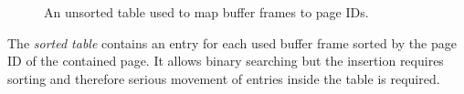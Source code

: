 \begin{@empty}

	\begin{figure}[ht!]
		\centering
        \vspace{.5em}
		\caption{An unsorted table used to map buffer frames to page IDs.}
		\label{fig:unsortedTable}
	\end{figure}
\end{@empty}
	
	The \emph{sorted table} contains an entry for each used buffer frame sorted by the page ID of the contained page. It allows binary searching but the insertion requires sorting and therefore serious movement of entries inside the table is required.

